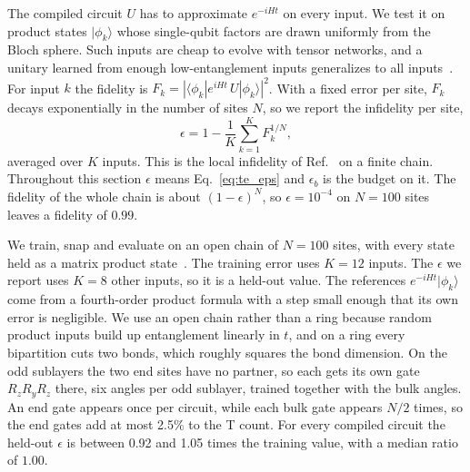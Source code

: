 The compiled circuit $U$ has to approximate $e^{-iHt}$ on every input. We test it on product states $|\phi_k\rangle$ whose single-qubit factors are drawn uniformly from the Bloch sphere. Such inputs are cheap to evolve with tensor networks, and a unitary learned from enough low-entanglement inputs generalizes to all inputs~\cite{Caro2023,Gibbs2025infinite}. For input $k$ the fidelity is $F_k = |\langle \phi_k | e^{iHt}\, U | \phi_k \rangle|^{2}$. With a fixed error per site, $F_k$ decays exponentially in the number of sites $N$, so we report the infidelity per site,
\begin{equation}
\epsilon = 1 - \frac{1}{K} \sum_{k=1}^{K} F_k^{1/N} ,
\label{eq:te_eps}
\end{equation}
averaged over $K$ inputs. This is the local infidelity of Ref.~\cite{Gibbs2025infinite} on a finite chain. Throughout this section $\epsilon$ means Eq.~\eqref{eq:te_eps} and $\epsilon_b$ is the budget on it. The fidelity of the whole chain is about $(1 - \epsilon)^{N}$, so $\epsilon = 10^{-4}$ on $N = 100$ sites leaves a fidelity of $0.99$.

We train, snap and evaluate on an open chain of $N = 100$ sites, with every state held as a matrix product state~\cite{Schollwock2011}. The training error uses $K = 12$ inputs. The $\epsilon$ we report uses $K = 8$ other inputs, so it is a held-out value. The references $e^{-iHt}|\phi_k\rangle$ come from a fourth-order product formula with a step small enough that its own error is negligible. We use an open chain rather than a ring because random product inputs build up entanglement linearly in $t$, and on a ring every bipartition cuts two bonds, which roughly squares the bond dimension. On the odd sublayers the two end sites have no partner, so each gets its own gate $R_z R_y R_z$ there, six angles per odd sublayer, trained together with the bulk angles. An end gate appears once per circuit, while each bulk gate appears $N/2$ times, so the end gates add at most 2.5\% to the T count. For every compiled circuit the held-out $\epsilon$ is between 0.92 and 1.05 times the training value, with a median ratio of $1.00$. 

